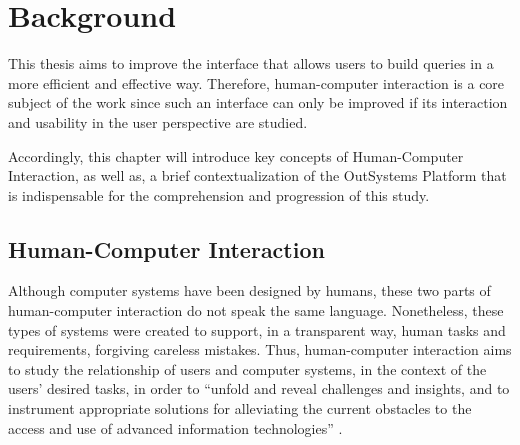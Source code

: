 \chapter{Background}
\label{cha:background}
This thesis aims to improve the interface that allows users to build queries in a more efficient and effective way. Therefore, human-computer interaction is a core subject of the work since such an interface can only be improved if its interaction and usability in the user perspective are studied.

Accordingly, this chapter will introduce key concepts of Human-Computer Interaction, as well as, a brief contextualization of the OutSystems Platform that is indispensable for the comprehension and progression of this study.

\section{Human-Computer Interaction}
\label{sec:human_computer_interaction}
Although computer systems have been designed by humans, these two parts of human-computer interaction do not speak the same language. Nonetheless, these types of systems were created to support, in a transparent way, human tasks and requirements, forgiving careless mistakes. \cite{humanComputerInteraction} Thus, human-computer interaction aims to study the relationship of users and computer systems, in the context of the users’ desired tasks, in order to “unfold and reveal challenges and insights, and to instrument appropriate solutions for alleviating the current obstacles to the access and use of advanced information technologies” \cite{userInterfacesForAll_newPerspectivesIntoHumanComputerInteraction}. 




